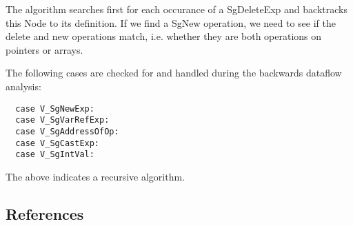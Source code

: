 The algorithm searches first for each occurance of a SgDeleteExp and backtracks this Node to
its definition. If we find a SgNew operation, we need to see if the delete and new operations match,
i.e. whether they are both operations on pointers or arrays.

The following cases are checked for and handled during the backwards dataflow analysis:
\begin{verbatim}
  case V_SgNewExp: 
  case V_SgVarRefExp:   
  case V_SgAddressOfOp: 
  case V_SgCastExp:
  case V_SgIntVal: 
\end{verbatim}

The above indicates a recursive algorithm.

\subsection{References}

